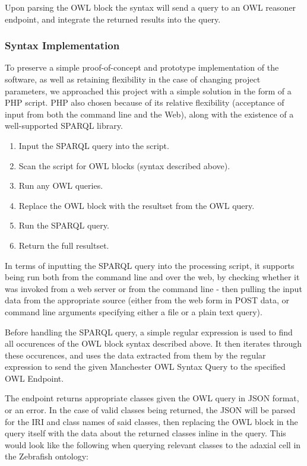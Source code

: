 \documentclass{article}
\begin{document}
Upon parsing the OWL block the syntax will send a query to an OWL reasoner
endpoint, and integrate the returned results into the query. 

\subsubsection{Syntax Implementation}

To preserve a simple proof-of-concept and prototype implementation of the
software, as well as retaining flexibility in the case of changing project
parameters, we approached this project with a simple solution in the form of a
PHP script. PHP also chosen because of its relative flexibility (acceptance of
input from both the command line and the Web), along with the existence of a
well-supported SPARQL library.

\begin{enumerate}
    \item Input the SPARQL query into the script.
    \item Scan the script for OWL blocks (syntax described above).
    \item Run any OWL queries.
    \item Replace the OWL block with the resultset from the OWL query.
    \item Run the SPARQL query.
    \item Return the full resultset.
\end{enumerate}

In terms of inputting the SPARQL query into the processing script, it supports
being run both from the command line and over the web, by checking whether it
was invoked from a web server or from the command line - then pulling the input
data from the appropriate source (either from the web form in POST data, or command
line arguments specifying either a file or a plain text query).

Before handling the SPARQL query, a simple regular expression is used to find
all occurences of the OWL block syntax described above. It then iterates through
these occurences, and uses the data extracted from them by the regular
expression to send the given Manchester OWL Syntax Query to the specified OWL
Endpoint.

The endpoint returns appropriate classes given the OWL query in JSON format, or an 
error. In the case of valid classes being returned, the JSON will be parsed for
the IRI and class names of said classes, then replacing the OWL block in
the query itself with the data about the returned classes inline in the query.
This would look like the following when querying relevant classes to the adaxial
cell in the Zebrafish ontology\cite{zfin}:
\end{document}
